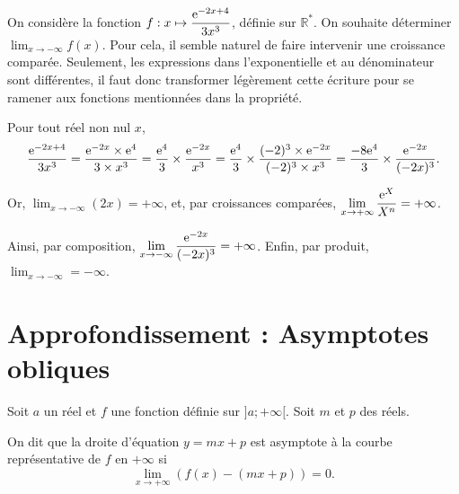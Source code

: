 \documentclass[11pt,fleqn, openany]{book} %
\begin{document}
\begin{example}On considère la fonction $f : x\mapsto \dfrac{\mathrm{e}^{-2x+4}}{3x^3}$, définie sur $\mathbb{R}^*$. On souhaite déterminer $\displaystyle\lim_{x \to -\infty}f(x)$. Pour cela, il semble naturel de faire intervenir une croissance comparée. Seulement, les expressions dans l'exponentielle et au dénominateur sont différentes, il faut donc transformer légèrement cette écriture pour se ramener aux fonctions mentionnées dans la propriété.

Pour tout réel non nul $x$, 
\[\dfrac{\mathrm{e}^{-2x+4}}{3x^3} = \dfrac{\mathrm{e}^{-2x} \times \mathrm{e}^{4}}{3 \times x^3}=\dfrac{\mathrm{e}^4}{3} \times \dfrac{\mathrm{e}^{-2x}}{x^3}=\dfrac{\mathrm{e}^4}{3} \times \dfrac{(-2)^3 \times \mathrm{e}^{-2x}}{(-2)^3 \times x^3} = \dfrac{-8\mathrm{e}^4}{3} \times \dfrac{\mathrm{e}^{-2x}}{(-2x)^3}.\]

Or, $\displaystyle\lim_{x \to - \infty}(2x)=+\infty$, et, par croissances comparées, $\displaystyle \lim_{x \to +\infty} \dfrac{\mathrm{e}^X}{X^n}=+\infty$. 

Ainsi, par composition, $\displaystyle \lim_{x \to -\infty} \dfrac{\mathrm{e}^{-2x}}{(-2x)^3}=+\infty$. Enfin, par produit, $\displaystyle \lim_{x \to -\infty}=-\infty$.\end{example}



\section{Approfondissement : Asymptotes obliques}

\begin{definition}Soit $a$ un réel et $f$ une fonction définie sur $]a;+\infty[$. Soit $m$ et $p$ des réels. 

On dit que la droite d'équation $y=mx+p$ est asymptote à la courbe représentative de $f$ en $+\infty$ si \[\displaystyle \lim_{x \to +\infty} (f(x)-(mx+p))=0.\]\end{definition}
\end{document}
